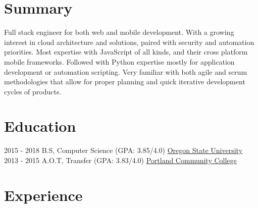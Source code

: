 \documentclass[letterpaper]{twentysecondcv} %
\begin{document}
\makeprofile %


\section{Summary}
    Full stack engineer for both web and mobile development. With a growing interest in cloud architecture and solutions, paired with security and automation priorities. 
    \newline \newline 
    Most expertise with JavaScript of all kinds, and their cross platform mobile frameworks. Followed with Python expertise mostly for application development or automation scripting.
    \newline \newline
    Very familiar with both agile and scrum methodologies that allow for proper planning and quick iterative development cycles of products.
\section{Education}

\begin{twenty} %
	\twentyitem
    	{2015 - 2018 }
        {}
        {  B.S, Computer Science \textnormal{(GPA: 3.85/4.0)}}
        {\href{http://www.oregonstate.edu/}{Oregon State University}}
        {}
        {}
	\twentyitem
    	{2013 - 2015}
		{}
        {  A.O.T, Transfer \textnormal{(GPA: 3.83/4.0)}}
        {\href{https://www.pcc.edu/}{Portland Community College}}
        {}
        {}
\end{twenty}


\section{Experience}
\end{document}
